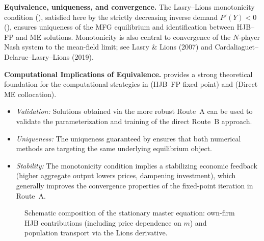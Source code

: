 ﻿\documentclass[11pt,letterpaper,oneside]{article}
\numberwithin{equation}{section}
\newcommand{\1}{\mathbf{1}}
\newcommand{\Dm}{D\_m}
\begin{document}
\begin{tcolorbox}[didacticstyle]
\begin{itemize}[leftmargin=1.1em,itemsep=0.25em]
\begin{tcolorbox}[literaturestyle]
\textbf{Equivalence, uniqueness, and convergence.} The Lasry--Lions monotonicity condition (), satisfied here by the strictly decreasing inverse demand $P'(Y)<0$ (), ensures uniqueness of the MFG equilibrium and identification between HJB--FP and ME solutions. Monotonicity is also central to convergence of the $N$-player Nash system to the mean-field limit; see Lasry \& Lions (2007) and Cardaliaguet--Delarue--Lasry--Lions (2019).
\end{tcolorbox}

\begin{tcolorbox}[mathstyle]
\textbf{Computational Implications of Equivalence.}
 provides a strong theoretical foundation for the computational strategies in  (HJB--FP fixed point) and  (Direct ME collocation).
\begin{itemize}[leftmargin=1.15em,itemsep=0.25em]
\item \emph{Validation:} Solutions obtained via the more robust Route~A can be used to validate the parameterization and training of the direct Route~B approach.
\item \emph{Uniqueness:} The uniqueness guaranteed by  ensures that both numerical methods are targeting the same underlying equilibrium object.
\item \emph{Stability:} The monotonicity condition implies a stabilizing economic feedback (higher aggregate output lowers prices, dampening investment), which generally improves the convergence properties of the fixed-point iteration in Route~A.
\end{itemize}
\end{tcolorbox}

\begin{figure}[ht]
\centering
{}
\caption{Schematic composition of the stationary master equation: own-firm HJB contributions (including price dependence on $m$) and population transport via the Lions derivative.}
\end{figure}


\end{itemize}
\end{tcolorbox}
\end{document}
